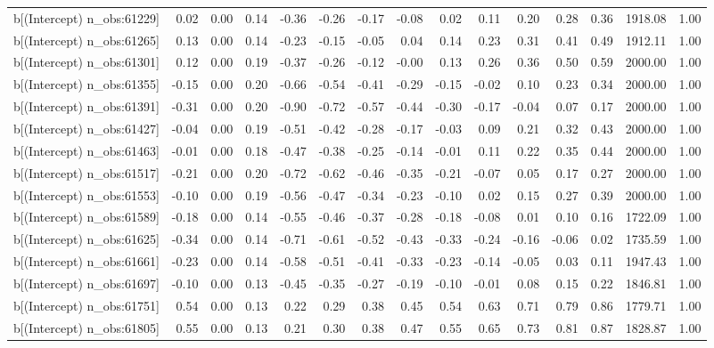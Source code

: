\begin{table}[ht]
\begin{tabular}{rrrrrrrrrrrrrrr}
  b[(Intercept) n\_obs:61229] & 0.02 & 0.00 & 0.14 & -0.36 & -0.26 & -0.17 & -0.08 & 0.02 & 0.11 & 0.20 & 0.28 & 0.36 & 1918.08 & 1.00 \\ 
  b[(Intercept) n\_obs:61265] & 0.13 & 0.00 & 0.14 & -0.23 & -0.15 & -0.05 & 0.04 & 0.14 & 0.23 & 0.31 & 0.41 & 0.49 & 1912.11 & 1.00 \\ 
  b[(Intercept) n\_obs:61301] & 0.12 & 0.00 & 0.19 & -0.37 & -0.26 & -0.12 & -0.00 & 0.13 & 0.26 & 0.36 & 0.50 & 0.59 & 2000.00 & 1.00 \\ 
  b[(Intercept) n\_obs:61355] & -0.15 & 0.00 & 0.20 & -0.66 & -0.54 & -0.41 & -0.29 & -0.15 & -0.02 & 0.10 & 0.23 & 0.34 & 2000.00 & 1.00 \\ 
  b[(Intercept) n\_obs:61391] & -0.31 & 0.00 & 0.20 & -0.90 & -0.72 & -0.57 & -0.44 & -0.30 & -0.17 & -0.04 & 0.07 & 0.17 & 2000.00 & 1.00 \\ 
  b[(Intercept) n\_obs:61427] & -0.04 & 0.00 & 0.19 & -0.51 & -0.42 & -0.28 & -0.17 & -0.03 & 0.09 & 0.21 & 0.32 & 0.43 & 2000.00 & 1.00 \\ 
  b[(Intercept) n\_obs:61463] & -0.01 & 0.00 & 0.18 & -0.47 & -0.38 & -0.25 & -0.14 & -0.01 & 0.11 & 0.22 & 0.35 & 0.44 & 2000.00 & 1.00 \\ 
  b[(Intercept) n\_obs:61517] & -0.21 & 0.00 & 0.20 & -0.72 & -0.62 & -0.46 & -0.35 & -0.21 & -0.07 & 0.05 & 0.17 & 0.27 & 2000.00 & 1.00 \\ 
  b[(Intercept) n\_obs:61553] & -0.10 & 0.00 & 0.19 & -0.56 & -0.47 & -0.34 & -0.23 & -0.10 & 0.02 & 0.15 & 0.27 & 0.39 & 2000.00 & 1.00 \\ 
  b[(Intercept) n\_obs:61589] & -0.18 & 0.00 & 0.14 & -0.55 & -0.46 & -0.37 & -0.28 & -0.18 & -0.08 & 0.01 & 0.10 & 0.16 & 1722.09 & 1.00 \\ 
  b[(Intercept) n\_obs:61625] & -0.34 & 0.00 & 0.14 & -0.71 & -0.61 & -0.52 & -0.43 & -0.33 & -0.24 & -0.16 & -0.06 & 0.02 & 1735.59 & 1.00 \\ 
  b[(Intercept) n\_obs:61661] & -0.23 & 0.00 & 0.14 & -0.58 & -0.51 & -0.41 & -0.33 & -0.23 & -0.14 & -0.05 & 0.03 & 0.11 & 1947.43 & 1.00 \\ 
  b[(Intercept) n\_obs:61697] & -0.10 & 0.00 & 0.13 & -0.45 & -0.35 & -0.27 & -0.19 & -0.10 & -0.01 & 0.08 & 0.15 & 0.22 & 1846.81 & 1.00 \\ 
  b[(Intercept) n\_obs:61751] & 0.54 & 0.00 & 0.13 & 0.22 & 0.29 & 0.38 & 0.45 & 0.54 & 0.63 & 0.71 & 0.79 & 0.86 & 1779.71 & 1.00 \\ 
  b[(Intercept) n\_obs:61805] & 0.55 & 0.00 & 0.13 & 0.21 & 0.30 & 0.38 & 0.47 & 0.55 & 0.65 & 0.73 & 0.81 & 0.87 & 1828.87 & 1.00 \\ 

\end{tabular}
\end{table}
